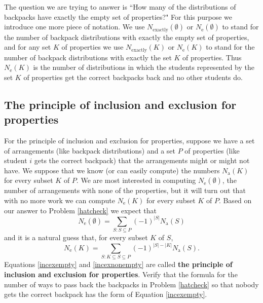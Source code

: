 The question we are trying to answer is ``How many of the
distributions of backpacks have exactly the empty set of properties?" 
For this purpose we introduce one more piece of notation.  We use
$N_{\mbox{exactly}}(\emptyset)$ or $N_{\mbox{e}}(\emptyset)$ to stand for
the number of backpack distributions with exactly the empty set of
properties, and for any set $K$ of properties we use
$N_{\mbox{exactly}}(K)$ or $N_{\mbox{e}}(K)$ to stand for the number of
backpack distributions with exactly the set $K$ of properties.  Thus
$N_{\mbox{e}}(K)$ is the number of distributions in which the students
represented by the set $K$ of properties get the correct backpacks back
and no other students do.  

\subsection{The principle of inclusion and exclusion for properties}
For the principle of inclusion and exclusion for properties, suppose we
have a set of arrangements (like backpack distributions) and a set $P$ of
properties (like student $i$ gets the correct backpack) that the
arrangements might or might not have.  We suppose that we know (or can
easily compute) the numbers $N_{\mbox{a}}(K)$ for every subset $K$ of
$P$.  We are most interested in computing $N_{\mbox{e}}(\emptyset)$, the
number of arrangements with none of the properties, but it will turn out
that with no more work we can compute $N_{\mbox{e}}(K)$ for every subset
$K$ of $P$.  Based on our answer to Problem \ref{hatcheck} we expect that
\begin{equation}
N_{\mbox{e}}(\emptyset) = \sum_{S: S\subseteq P} (-1)^{|S|}N_{\mbox{a}}(S)
\label{incexempty}\end{equation}
and it is a natural guess that, for every subset $K$ of $S$,
\begin{equation}
N_{\mbox{e}}(K) = \sum_{S: K\subseteq S\subseteq P}
(-1)^{|S|-|K|}N_{\mbox{a}}(S).\label{incexnonempty}\end{equation}
Equations  \ref{incexempty} and \ref{incexnonempty} are called {\bf the
principle of inclusion and exclusion for properties}.
\bp
\itemm Verify that the formula for the number of ways to pass back the
backpacks in Problem
\ref{hatcheck} so that nobody gets the correct backpack has the form of
Equation
\ref{incexempty}.
